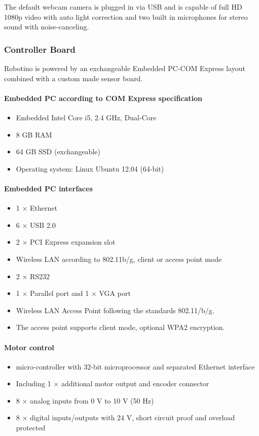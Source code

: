 \documentclass[12pt,twoside]{article}
\begin{document}
\begin{appendix}
The default webcam camera is plugged in via USB and is capable of full
HD 1080p video with auto light correction and two built in microphones
for stereo sound with noise-canceling.

\subsubsection{Controller Board}
Robotino is powered by an exchangeable Embedded PC-COM Express
layout combined with a custom made sensor board.

\paragraph{Embedded PC according to COM Express specification}
\begin{itemize}
\item Embedded Intel Core i5, 2.4 GHz, Dual-Core
\item 8 GB RAM
\item 64 GB SSD (exchangeable)
\item Operating system: Linux Ubuntu 12.04 (64-bit)
\end{itemize}

\paragraph{Embedded PC interfaces}
\begin{itemize}
\item 1 $\times$ Ethernet
\item 6 $\times$ USB 2.0
\item 2 $\times$ PCI Express expansion slot
\item Wireless LAN according to 802.11b/g, client or access point mode
\item 2 $\times$  RS232
\item 1 $\times$ Parallel port and 1 $\times$ VGA port
\item Wireless LAN Access Point following the standards 802.11/b/g.
\item The access point supports client mode, optional WPA2 encryption.
\end{itemize}

\paragraph{Motor control}
\begin{itemize}
\item micro-controller with 32-bit microprocessor and separated
  Ethernet interface
\item Including 1 $\times$ additional motor output and encoder
  connector
\item 8 $\times$ analog inputs from 0 V to 10 V (50 Hz)
\item 8 $\times$ digital inputs/outputs with 24 V, short circuit proof
  and overload protected
\end{itemize}


\end{appendix}
\end{document}
